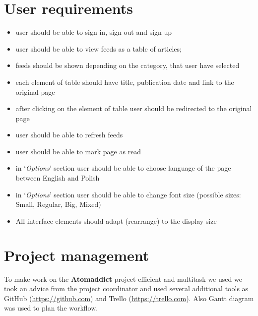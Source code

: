 \documentclass[12pt]{article}
\begin{document}
\section{User requirements}\label{user requirements}

\begin{itemize}

    \item user should be able to sign in, sign out and sign up

    \item user should be able to view feeds as a table of articles; 

    \item feeds should be shown depending on the category, that user have selected

    \item each element of table should have title, publication date and link to the original page

    \item after clicking on the element of table user should be redirected to the original page

    \item user should be able to refresh feeds

    \item user should be able to mark page as read

    \item in `\emph{Options}' section user should be able to choose language of the page between English and Polish

    \item in `\emph{Options}' section user should be able to change font size (possible sizes:  Small, Regular, Big, Mixed)

    \item All interface elements should adapt (rearrange) to the display size

\end{itemize}

\section{Project management}\label{project management}
To make work on the \textbf{Atomaddict} project efficient and multitask we used we took an advice from the project coordinator and used several additional tools as GitHub (\url{https://github.com}) and Trello (\url{https://trello.com}). Also Gantt diagram was used to plan the workflow.
\end{document}
